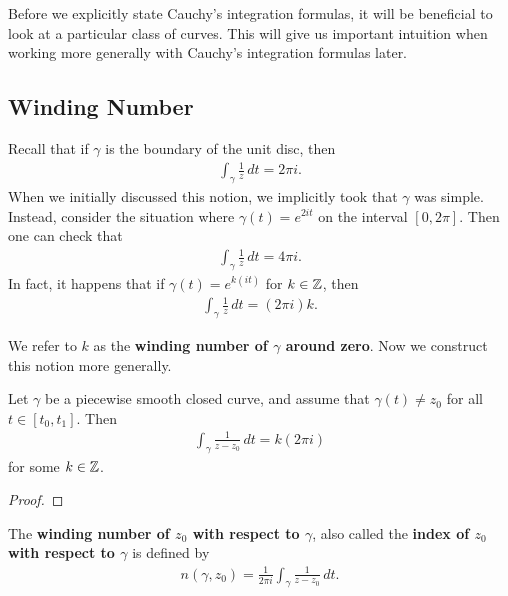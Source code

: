 \documentclass{memoir}
\begin{document}


Before we explicitly state Cauchy's integration formulas, it will be beneficial to look at a particular class of curves. This will give us important intuition when working more generally with Cauchy's integration formulas later.

\subsection{Winding Number}
\label{sub:winding_number}

Recall that if \(\gamma \) is the boundary of the unit disc, then
\begin{align*}
	\int_{\gamma } \frac{1}{z} \,d t = 2\pi i. 
\end{align*}
When we initially discussed this notion, we implicitly took that \(\gamma \) was simple. Instead, consider the situation where \(\gamma(t) = e^{2it}\) on the interval \([0,2\pi ]\). Then one can check that
\begin{align*}
	\int_\gamma  \frac{1}{z}\,d t = 4\pi i.
\end{align*}
In fact, it happens that if \(\gamma(t) = e^{k(it)}\) for \(k \in \mathbb{Z}\), then
\begin{align*}
	\int_\gamma \frac{1}{z}\,d t = (2\pi i)k.
\end{align*}

We refer to \(k\) as the \textbf{winding number of \(\gamma \) around zero}. Now we construct this notion more generally.

\begin{lemma}
	Let \(\gamma \) be a piecewise smooth closed curve, and assume that \(\gamma (t)\neq z_0\) for all \(t \in [t_0,t_1]\). Then
	\begin{align*}
		\int_{\gamma } \frac{1}{z-z_0}\,d t = k(2\pi i) 
	\end{align*}
	for some \(k \in \mathbb{Z}\).
\end{lemma}
\begin{proof}
	
\end{proof}

\begin{defn}
	The \textbf{winding number of \(z_0\) with respect to \(\gamma \)}, also called the \textbf{index of \(z_0\) with respect to \(\gamma \)} is defined by
	\begin{align*}
		n(\gamma ,z_0) = \frac{1}{2\pi i} \int_\gamma \frac{1}{z-z_0}\,d t.
	\end{align*}
\end{defn}
\end{document}
